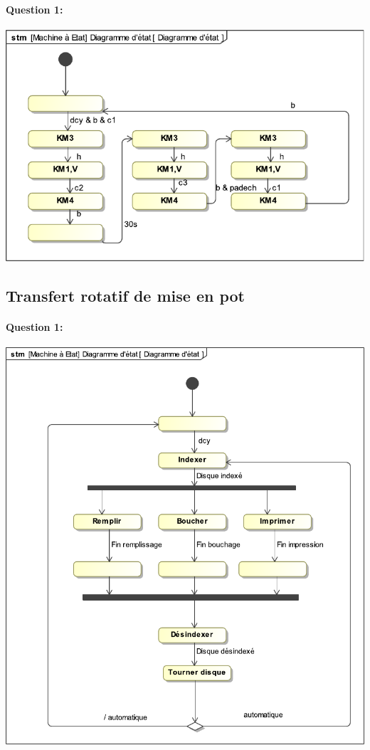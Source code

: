 \paragraph{Question 1:}

\begin{center}
 \includegraphics[width=0.7\linewidth]{img/traitement_cor}
\end{center}

\subsection{Transfert rotatif de mise en pot}

\paragraph{Question 1:}

\begin{center}
 \includegraphics[width=0.7\linewidth]{img/remplir_pot_cor}
\end{center}


